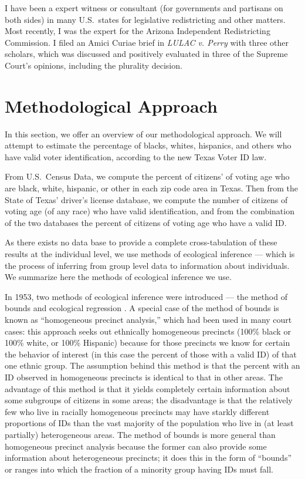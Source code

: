 \documentclass[12pt]{article}
\begin{document}
I have been a expert witness or consultant (for governments and
partisans on both sides) in many U.S.\ states for legislative
redistricting and other matters.  Most recently, I was the expert for
the Arizona Independent Redistricting Commission.  I filed an Amici
Curiae brief in \emph{LULAC v. Perry} with three other scholars, which
was discussed and positively evaluated in three of the Supreme Court's
opinions, including the plurality decision.

\section{Methodological Approach}\label{s:methods}

In this section, we offer an overview of our methodological approach.
We will attempt to estimate the percentage of blacks, whites,
hispanics, and others who have valid voter identification, according
to the new Texas Voter ID law.  

From U.S.\ Census Data, we compute the percent of citizens' of voting
age who are black, white, hispanic, or other in each zip code area in
Texas.  Then from the State of Texas' driver's license database, we
compute the number of citizens of voting age (of any race) who have
valid identification, and from the combination of the two databases
the percent of citizens of voting age who have a valid ID.  

As there exists no data base to provide a complete cross-tabulation of
these results at the individual level, we use methods of ecological
inference --- which is the process of inferring from group level data
to information about individuals.  We summarize here the methods of
ecological inference we use.

In 1953, two methods of ecological inference were introduced --- the
method of bounds \citep{DunDav53} and ecological regression
\citep{Goodman53}. A special case of the method of bounds is known as
``homogeneous precinct analysis,'' which had been used in many court
cases: this approach seeks out ethnically homogeneous precincts (100\%
black or 100\% white, or 100\% Hispanic) because for those precincts
we know for certain the behavior of interest (in this case the percent
of those with a valid ID) of that one ethnic group.  The assumption
behind this method is that the percent with an ID observed in
homogeneous precincts is identical to that in other areas. The
advantage of this method is that it yields completely certain
information about some subgroups of citizens in some areas; the
disadvantage is that the relatively few who live in racially
homogeneous precincts may have starkly different proportions of IDs
than the vast majority of the population who live in (at least
partially) heterogeneous areas.  The method of bounds is more general
than homogeneous precinct analysis because the former can also provide
some information about heterogeneous precincts; it does this in the
form of ``bounds'' or ranges into which the fraction of a minority
group having IDs must fall.
\end{document}
